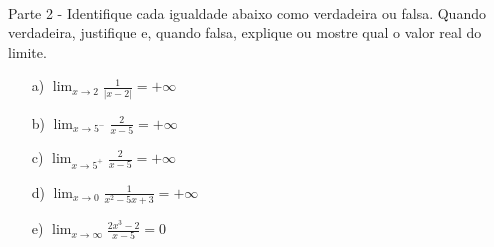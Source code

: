 \documentclass{article}
\begin{document}
\paragraph{}Parte 2 - Identifique cada igualdade abaixo como verdadeira ou falsa. Quando verdadeira, justifique e, quando falsa, explique ou mostre qual o valor real do limite.
\begin{itemize}
\item [a)] $\lim_{x\to2}\frac{1}{|x - 2|}=+\infty$
\item [b)] $\lim_{x\to5^-}\frac{2}{x - 5}=+\infty$
\item [c)] $\lim_{x\to5^+}\frac{2}{x - 5}=+\infty$
\item [d)] $\lim_{x\to0}\frac{1}{x^2 - 5x + 3}=+\infty$
\item [e)] $\lim_{x\to\infty}\frac{2x^3 - 2}{x - 5}=0$
\end{itemize}
\end{document}
